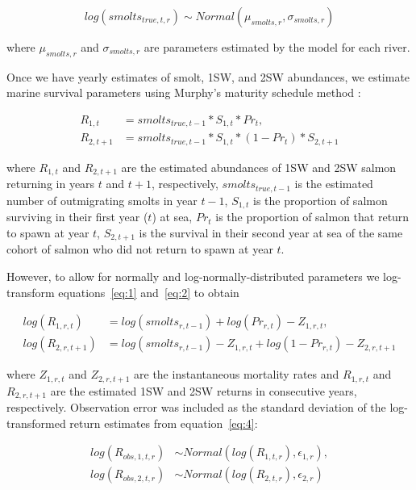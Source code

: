 \documentclass[12pt]{article}
\begin{document}
\begin{equation}
log(smolts_{true,t,r}) \sim Normal(\mu_{smolts,r}, \sigma_{smolts,r})
\end{equation}

where $\mu_{smolts,r}$ and $\sigma_{smolts,r}$ are parameters estimated by the
model for each river.

Once we have yearly estimates of smolt, 1SW, and 2SW abundances, we estimate
marine survival parameters using Murphy's maturity schedule method
\citep{Murphy1952, Ricker1975}:

\begin{align}
    R_{1,t} &= smolts_{true,t-1} * S_{1,t} * Pr_t \label{eq:1}, \\
    R_{2,t+1} &= smolts_{true,t-1} * S_{1,t} * (1 - Pr_t) * S_{2,t+1} \label{eq:2}
\end{align}

where $R_{1,t}$ and $R_{2,t+1}$ are the estimated abundances of 1SW and 2SW
salmon returning in years $t$ and $t+1$, respectively, $smolts_{true,t-1}$ is the
estimated number of outmigrating smolts in year $t-1$, $S_{1,t}$ is the proportion of
salmon surviving in their first year ($t$) at sea, $Pr_t$ is the proportion of
salmon that return to spawn at year $t$, $S_{2,t+1}$ is the survival in their
second year at sea of the same cohort of salmon who did not return to spawn at
year $t$.

However, to allow for normally and log-normally-distributed parameters we
log-transform equations~\ref{eq:1} and~\ref{eq:2} to obtain

\begin{align}
    log(R_{1,r,t}) &= log(smolts_{r,t-1}) + log(Pr_{r,t}) - Z_{1,r,t} \label{eq:3}, \\
    log(R_{2,r,t+1}) &= log(smolts_{r,t-1}) - Z_{1,r,t} + log(1 - Pr_{r,t})  - Z_{2,r,t+1} \label{eq:4} 
\end{align}

where $Z_{1,r,t}$ and $Z_{2,r,t+1}$ are the instantaneous mortality rates and
$R_{1,r,t}$ and $R_{2,r,t+1}$ are the estimated 1SW and 2SW returns in
consecutive years, respectively. Observation error was included as the
standard deviation of the log-transformed return estimates from
equation~\ref{eq:4}:

\begin{align}
log(R_{obs,1,t,r}) &\sim Normal(log(R_{1,t,r}), \epsilon_{1,r}), \\
log(R_{obs,2,t,r}) &\sim Normal(log(R_{2,t,r}), \epsilon_{2,r}) \label{eq:5} 
\end{align}
\end{document}
